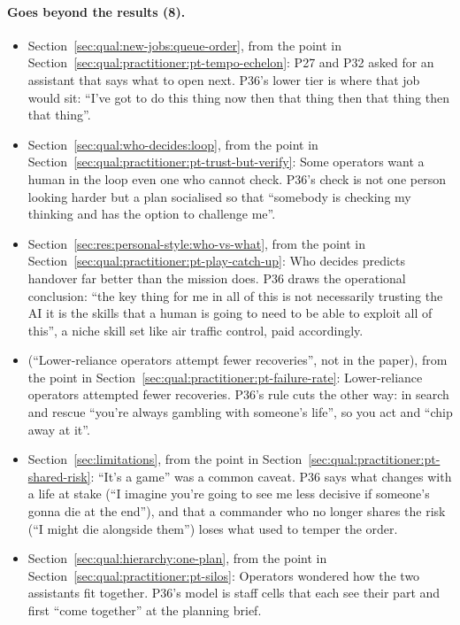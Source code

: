 \paragraph*{Goes beyond the results (8).}
\begin{itemize}[leftmargin=1.2em,itemsep=1pt]\small
\item Section~\ref{sec:qual:new-jobs:queue-order}, from the point in Section~\ref{sec:qual:practitioner:pt-tempo-echelon}: P27 and P32 asked for an assistant that says what to open next. P36's lower tier is where that job would sit: ``I've got to do this thing now then that thing then that thing then that thing''.
\item Section~\ref{sec:qual:who-decides:loop}, from the point in Section~\ref{sec:qual:practitioner:pt-trust-but-verify}: Some operators want a human in the loop even one who cannot check. P36's check is not one person looking harder but a plan socialised so that ``somebody is checking my thinking and has the option to challenge me''.
\item Section~\ref{sec:res:personal-style:who-vs-what}, from the point in Section~\ref{sec:qual:practitioner:pt-play-catch-up}: Who decides predicts handover far better than the mission does. P36 draws the operational conclusion: ``the key thing for me in all of this is not necessarily trusting the AI it is the skills that a human is going to need to be able to exploit all of this'', a niche skill set like air traffic control, paid accordingly.
\item (``Lower-reliance operators attempt fewer recoveries'', not in the paper), from the point in Section~\ref{sec:qual:practitioner:pt-failure-rate}: Lower-reliance operators attempted fewer recoveries. P36's rule cuts the other way: in search and rescue ``you're always gambling with someone's life'', so you act and ``chip away at it''.
\item Section~\ref{sec:limitations}, from the point in Section~\ref{sec:qual:practitioner:pt-shared-risk}: ``It's a game'' was a common caveat. P36 says what changes with a life at stake (``I imagine you're going to see me less decisive if someone's gonna die at the end''), and that a commander who no longer shares the risk (``I might die alongside them'') loses what used to temper the order.
\item Section~\ref{sec:qual:hierarchy:one-plan}, from the point in Section~\ref{sec:qual:practitioner:pt-silos}: Operators wondered how the two assistants fit together. P36's model is staff cells that each see their part and first ``come together'' at the planning brief.

\end{itemize}
